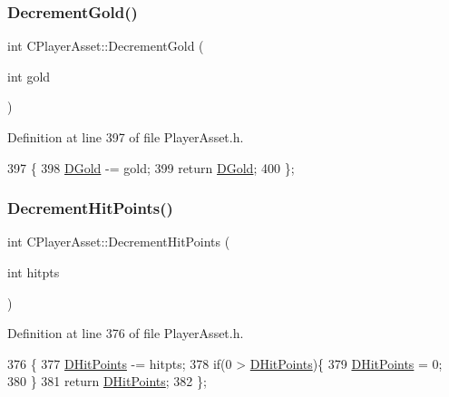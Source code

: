 \subsubsection{\texorpdfstring{Decrement\+Gold()}{DecrementGold()}}
{\footnotesize\ttfamily int C\+Player\+Asset\+::\+Decrement\+Gold (\begin{DoxyParamCaption}\item[{int}]{gold }\end{DoxyParamCaption})\hspace{0.3cm}{\ttfamily [inline]}}



Definition at line 397 of file Player\+Asset.\+h.


\begin{DoxyCode}
397                                    \{
398             \hyperlink{classCPlayerAsset_ab90ebdc73c6794fd44ddbe273f610292}{DGold} -= gold;
399             \textcolor{keywordflow}{return} \hyperlink{classCPlayerAsset_ab90ebdc73c6794fd44ddbe273f610292}{DGold};
400         \};
\end{DoxyCode}
\hypertarget{classCPlayerAsset_a34aa2679bb9d5d2d46774b8e7210fe53}{}\label{classCPlayerAsset_a34aa2679bb9d5d2d46774b8e7210fe53} 
\subsubsection{\texorpdfstring{Decrement\+Hit\+Points()}{DecrementHitPoints()}}
{\footnotesize\ttfamily int C\+Player\+Asset\+::\+Decrement\+Hit\+Points (\begin{DoxyParamCaption}\item[{int}]{hitpts }\end{DoxyParamCaption})\hspace{0.3cm}{\ttfamily [inline]}}



Definition at line 376 of file Player\+Asset.\+h.


\begin{DoxyCode}
376                                           \{
377             \hyperlink{classCPlayerAsset_a331750935bf594e665544085fb74e89d}{DHitPoints} -= hitpts;
378             \textcolor{keywordflow}{if}(0 > \hyperlink{classCPlayerAsset_a331750935bf594e665544085fb74e89d}{DHitPoints})\{
379                 \hyperlink{classCPlayerAsset_a331750935bf594e665544085fb74e89d}{DHitPoints} = 0;   
380             \}
381             \textcolor{keywordflow}{return} \hyperlink{classCPlayerAsset_a331750935bf594e665544085fb74e89d}{DHitPoints};
382         \};
\end{DoxyCode}
\hypertarget{classCPlayerAsset_a95f968ddfe0ec332764a730bced03834}{}\label{classCPlayerAsset_a95f968ddfe0ec332764a730bced03834} 
